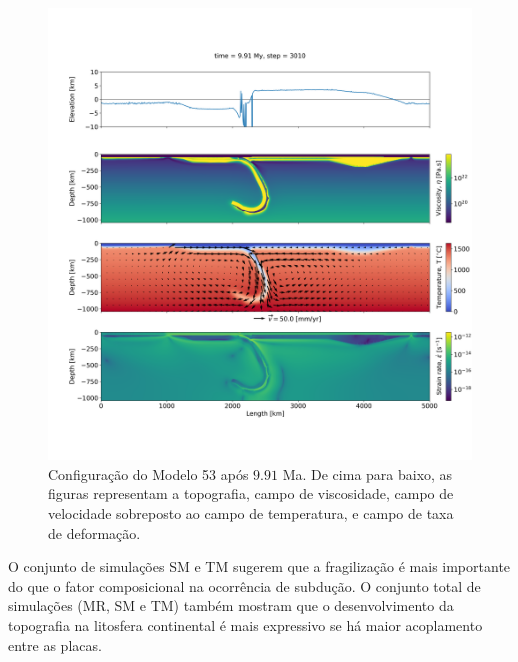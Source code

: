 
\begin{figure}
    \centering
    \includegraphics[trim={1.5cm 3.5cm 0.0cm 4cm}, clip, width=1.0 \textwidth]{fig/strak_53-11.png}
    \caption{Configuração do Modelo 53 após $9.91$ Ma. De cima para baixo, as figuras representam a topografia, campo de viscosidade, campo de velocidade sobreposto ao campo de temperatura, e campo de taxa de deformação.}
    \label{fig:stra_53-11}
\end{figure}


O conjunto de simulações SM e TM sugerem que a fragilização é mais importante do que o fator composicional na ocorrência de subdução. O conjunto total de simulações (MR, SM e TM) também mostram que o desenvolvimento da topografia na litosfera continental é mais expressivo se há maior acoplamento entre as placas. 









